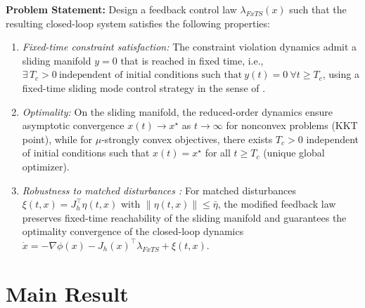 \documentclass[letterpaper, 10 pt, conference]{ieeeconf}
\begin{document}
\textbf{Problem Statement: }
Design a feedback control law $\lambda_{FxTS}(x)$ such that the resulting closed-loop system satisfies the following properties:
\begin{enumerate}
    \item \emph{Fixed-time constraint satisfaction:}  
    The constraint violation dynamics admit a sliding manifold $y=0$ that is reached in fixed time, i.e., $ \exists\, T_c > 0 \ \text{independent of initial conditions such that} \ 
    y(t)=0 \ \forall t \ge T_c$, using a fixed-time sliding mode control strategy in the sense of \cite{moulay_fxt}.

   \item \emph{Optimality:} On the sliding manifold, the reduced-order dynamics ensure asymptotic convergence $x(t)\to x^\star$ as $t\to\infty$ for nonconvex problems (KKT point), while for $\mu$-strongly convex objectives, there exists $T_c>0$ independent of initial conditions such that $x(t)=x^\star$ for all $t\ge T_c$ (unique global optimizer).
   
    \item \emph{Robustness to matched disturbances \cite{kamal2026robust}:}  
    For matched disturbances $\xi(t,x)=J_h^\top\eta(t,x)$ with $\|\eta(t,x)\|\le\bar{\eta}$, the modified feedback law preserves fixed-time reachability of the sliding manifold and guarantees the optimality convergence of the closed-loop dynamics $\dot{x}=-\nabla\phi(x)-J_h(x)^\top\lambda_{FxTS}+\xi(t,x)$.
\end{enumerate}

\section{Main Result}
\end{document}
